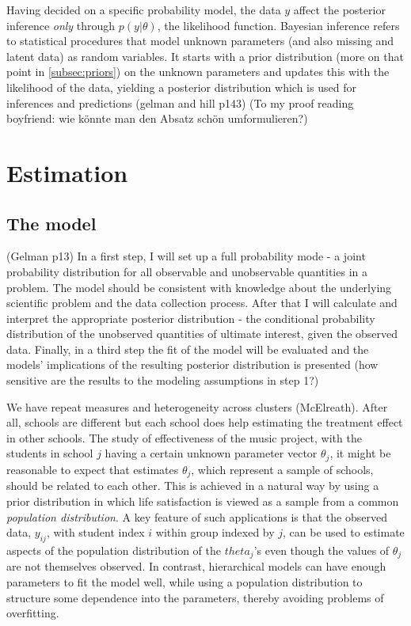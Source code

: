 \documentclass[a4, 12pt]{article}
\begin{document}
Having decided on a specific probability model, the data \(y\) affect the posterior inference \emph{only} through \(p(y|\theta)\), the likelihood function.
Bayesian inference refers to statistical procedures that model unknown parameters (and also missing and latent data) as random variables. It starts with a prior distribution (more on that point in \ref{subsec:priors}) on the unknown parameters and updates this with the likelihood of the data, yielding a posterior distribution which is used for inferences and predictions (gelman and hill p143) (To my proof reading boyfriend: wie könnte man den Absatz schön umformulieren?)

\hypertarget{estimation}{%
\section{Estimation}\label{estimation}}

\label{sec:estimation}

\hypertarget{the-model}{%
\subsection{The model}\label{the-model}}

\label{subsec:model}
(Gelman p13)
In a first step, I will set up a full probability mode - a joint probability distribution for all observable and unobservable quantities in a problem. The model should be consistent with knowledge about the underlying scientific problem and the data collection process.
After that I will calculate and interpret the appropriate posterior distribution - the conditional probability distribution of the unobserved quantities of ultimate interest, given the observed data.
Finally, in a third step the fit of the model will be evaluated and the models' implications of the resulting posterior distribution is presented (how sensitive are the results to the modeling assumptions in step 1?)

We have repeat measures and heterogeneity across clusters (McElreath). After all, schools are different but each school does help estimating the treatment effect in other schools.
The study of effectiveness of the music project, with the students in school \(j\) having a certain unknown parameter vector \(\theta_j\), it might be reasonable to expect that estimates \(\theta_j\), which represent a sample of schools, should be related to each other. This is achieved in a natural way by using a prior distribution in which life satisfaction is viewed as a sample from a common \emph{population distribution}. A key feature of such applications is that the observed data, \(y_{ij}\), with student index \(i\) within group indexed by \(j\), can be used to estimate aspects of the population distribution of the \(theta_j\)'s even though the values of \(\theta_j\) are not themselves observed. In contrast, hierarchical models can have enough parameters to fit the model well, while using a population distribution to structure some dependence into the parameters, thereby avoiding problems of overfitting.
\end{document}
